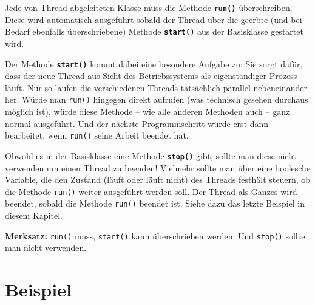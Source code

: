 Jede von Thread abgeleiteten Klasse muss die Methode \textbf{\lstinline|run()|}
überschreiben. Diese wird automatisch ausgeführt sobald der Thread über die
geerbte (und bei Bedarf ebenfalls überschriebene) Methode
\textbf{\lstinline|start()|} aus der Basisklasse  gestartet
wird.

Der Methode \textbf{\lstinline|start()|} kommt dabei eine besondere Aufgabe zu:
Sie sorgt dafür, dass der neue Thread aus Sicht des Betriebssystems als
eigenständiger Prozess läuft. Nur so laufen die verschiedenen Threads
tatsächlich parallel nebeneinander her. Würde man \lstinline|run()| hingegen
direkt aufrufen (was technisch gesehen durchaus möglich ist), würde diese
Methode -- wie alle anderen Methoden auch -- ganz normal ausgeführt. Und der
nächste Programmschritt würde erst dann bearbeitet, wenn \lstinline|run()| seine
Arbeit beendet hat.

Obwohl es in der Basisklasse  eine Methode
\textbf{\lstinline|stop()|} gibt, sollte man diese nicht verwenden um einen
Thread zu beenden! Vielmehr sollte man über eine boolesche Variable, die den
Zustand (läuft oder läuft nicht) des Threads festhält steuern, ob die Methode
\lstinline|run()| weiter ausgeführt werden soll. Der Thread als Ganzes wird
beendet, sobald die Methode \lstinline|run()| beendet ist. Siehe dazu das letzte
Beispiel in diesem Kapitel.

\begin{center}
\begin{minipage}{1.0\textwidth}
\begin{framed}
\textbf{Merksatz:} \lstinline|run()| muss, \lstinline|start()| kann
überschrieben werden. Und \lstinline|stop()| sollte man nicht verwenden.
\end{framed}
\end{minipage}
\end{center}


\section{Beispiel}

